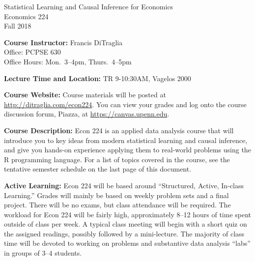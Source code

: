 \documentclass[11pt, letterpaper]{article}
\begin{document}
\thispagestyle{plain}

\begin{center}
\Large
\sc
Statistical Learning and Causal Inference for Economics\\
\large
Economics 224\\
\large
Fall 2018
\end{center}



\normalsize

\noindent \textbf{Course Instructor:} Francis DiTraglia \\
Office: PCPSE 630\\
Office Hours: Mon.\ 3--4pm, Thurs.\ 4--5pm

\medskip


%
%
%
% 
\noindent \textbf{Lecture Time and Location:} TR 9-10:30AM, Vagelos 2000 



\medskip
 
\noindent \textbf{Course Website:} Course materials will be posted at \url{http://ditraglia.com/econ224}.
You can view your grades and log onto the course discussion forum, Piazza, at \url{https://canvas.upenn.edu}.

\medskip



\noindent \textbf{Course Description:} Econ 224 is an applied data analysis course that will introduce you to key ideas from modern statistical learning and causal inference, and give you hands-on experience applying them to real-world problems using the R programming language.
For a list of topics covered in the course, see the tentative semester schedule on the last page of this document.

\medskip

\noindent \textbf{Active Learning:} Econ 224 will be based around ``Structured, Active, In-class Learning.'' 
Grades will mainly be based on weekly problem sets and a final project.
There will be no exams, but class attendance will be required.
The workload for Econ 224 will be fairly high, approximately 8--12 hours of time spent outside of class per week.
A typical class meeting will begin with a short quiz on the assigned readings, possibly followed by a mini-lecture. 
The majority of class time will be devoted to working on problems and substantive data analysis ``labs'' in groups of 3--4 students.
\end{document}
